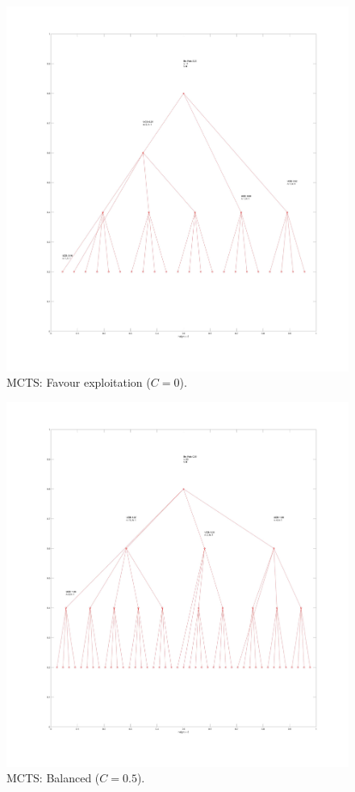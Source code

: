 \documentclass[11pt]{article}
\begin{document}
\begin{figure}
  \includegraphics[width=\linewidth]{img/c0.jpg}
  \caption{MCTS: Favour exploitation ($C=0$).}
  \label{fig:c0}
\end{figure}
\begin{figure}
  \includegraphics[width=\linewidth]{img/c05.jpg}
  \caption{MCTS: Balanced ($C=0.5$).}
  \label{fig:c05}
\end{figure}
\end{document}
